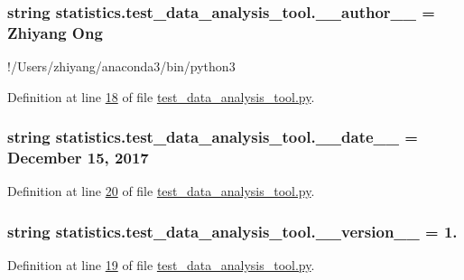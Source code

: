\subsubsection[{\+\_\+\+\_\+author\+\_\+\+\_\+}]{\setlength{\rightskip}{0pt plus 5cm}string statistics.\+test\+\_\+data\+\_\+analysis\+\_\+tool.\+\_\+\+\_\+author\+\_\+\+\_\+ = \textquotesingle{}Zhiyang Ong\textquotesingle{}}\label{namespacestatistics_1_1test__data__analysis__tool_a980d8dc33d59285196b930ec7ddabdc8}


!/\+Users/zhiyang/anaconda3/bin/python3 



Definition at line \hyperlink{test__data__analysis__tool_8py_source_l00018}{18} of file \hyperlink{test__data__analysis__tool_8py_source}{test\+\_\+data\+\_\+analysis\+\_\+tool.\+py}.

\hypertarget{namespacestatistics_1_1test__data__analysis__tool_a15ce2cfbc6ba4e95b94a79c18678373f}{}
\subsubsection[{\+\_\+\+\_\+date\+\_\+\+\_\+}]{\setlength{\rightskip}{0pt plus 5cm}string statistics.\+test\+\_\+data\+\_\+analysis\+\_\+tool.\+\_\+\+\_\+date\+\_\+\+\_\+ = \textquotesingle{}December 15, 2017\textquotesingle{}}\label{namespacestatistics_1_1test__data__analysis__tool_a15ce2cfbc6ba4e95b94a79c18678373f}


Definition at line \hyperlink{test__data__analysis__tool_8py_source_l00020}{20} of file \hyperlink{test__data__analysis__tool_8py_source}{test\+\_\+data\+\_\+analysis\+\_\+tool.\+py}.

\hypertarget{namespacestatistics_1_1test__data__analysis__tool_a3299e44231fc0bc029f4c6d86924b125}{}
\subsubsection[{\+\_\+\+\_\+version\+\_\+\+\_\+}]{\setlength{\rightskip}{0pt plus 5cm}string statistics.\+test\+\_\+data\+\_\+analysis\+\_\+tool.\+\_\+\+\_\+version\+\_\+\+\_\+ = \textquotesingle{}1.\textquotesingle{}}\label{namespacestatistics_1_1test__data__analysis__tool_a3299e44231fc0bc029f4c6d86924b125}


Definition at line \hyperlink{test__data__analysis__tool_8py_source_l00019}{19} of file \hyperlink{test__data__analysis__tool_8py_source}{test\+\_\+data\+\_\+analysis\+\_\+tool.\+py}.

